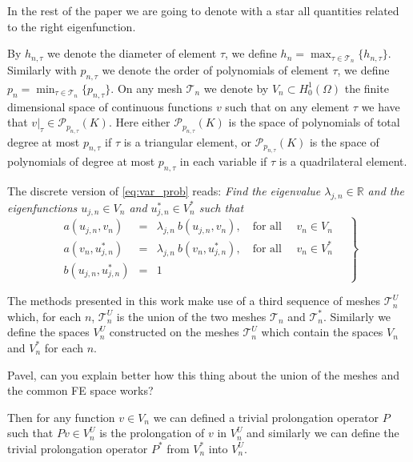 \documentclass[smallextended]{svjour3}
\begin{document}
In the rest of the paper we are going to denote with a star all quantities related to the right eigenfunction.

By $h_{n,\tau}$ we denote the diameter of element $\tau$,  
we define
$
h_n=\max_{\tau\in \mathcal{T}_n}\{h_{n,\tau}\}.
$
Similarly with  $p_{n,\tau}$ we denote  the order of polynomials of element $\tau$,  
we define
$
p_n=\min_{\tau\in \mathcal{T}_n}\{p_{n,\tau}\}.
$
On any mesh $\mathcal{T}_n$ we denote by $V_n \subset H^1_0(\Omega)$ the finite
dimensional space of continuous functions $v$ such that on any element $\tau$ we 
have that $v|_\tau\in \mathcal{P}_{p_{n,\tau}}(K)$. Here either $\mathcal{P}_{p_{n,\tau}}(K)$ 
is the space of polynomials of total degree at most $p_{n,\tau}$ if $\tau$ is a triangular 
element, or $\mathcal{P}_{p_{n,\tau}}(K)$ is the space of polynomials of degree at most 
$p_{n,\tau}$ in each variable if $\tau$ is a quadrilateral element.



The discrete version of \eqref{eq:var_prob} reads:
\emph{Find the eigenvalue $\lambda_{j,n}\in \mathbb{R}$ and the eigenfunctions $u_{j,n}\in V_n$ and $u_{j,n}^*\in V_n^*$
such that}
\begin{equation}
\label{eq:disc_prob}
\left.
\begin{array}{lcl}
a(u_{j,n},v_{n})&=& \lambda_{j,n}\ b(u_{j,n},v_{n}),
\quad \text{for all } \quad v_{n}  \in V_n\\
a(v_{n},u_{j,n}^*)&=& \lambda_{j,n}\ b(v_{n},u_{j,n}^*),
\quad \text{for all } \quad v_{n}  \in V_n^*\\
 b(u_{j,n},u_{j,n}^*) &=& 1
\end{array}\quad
\right\}
\end{equation}

The methods presented in this work make use of a third sequence of meshes $\mathcal{T}_n^U$ which, for each $n$, $\mathcal{T}_n^U$ is the union of the two meshes  $\mathcal{T}_n$ and $\mathcal{T}_n^*$. Similarly we define the spaces $V_n^U$ constructed on the meshes $\mathcal{T}_n^U$ which contain the spaces $V_n$ and $V_n^*$ for each $n$. 

{Pavel, can you explain better how this thing about the union of the meshes and the common FE space works?}

Then for any function $v\in V_n$ we can defined a trivial prolongation operator $P$ such that $Pv\in V_n^U$ is the prolongation of $v$ in $V_n^U$ and similarly we can define the trivial prolongation operator $P^*$ from $V_n^*$ into $V_n^U$. %
\end{document}
